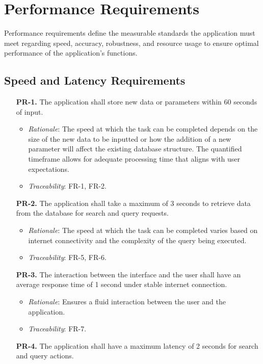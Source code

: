 \documentclass[12pt]{article}
\begin{document}
\section{Performance Requirements}
Performance requirements define the measurable standards the application must meet regarding speed, accuracy, robustness, and resource usage to ensure optimal performance of the application's functions.
\subsection{Speed and Latency Requirements}
\begin{enumerate}
\item[\textbf{PR-1.}] The application shall store new data or parameters within 60 seconds of input.
  \begin{itemize}
    \item \textit{Rationale}: The speed at which the task can be completed depends on the size of the new data to be inputted or how the addition of a new parameter will affect the existing database structure. The quantified timeframe allows for adequate processing time that aligns with user expectations.
    \item \textit{Traceability}: FR-1, FR-2.
  \end{itemize}
\item[\textbf{PR-2.}] The application shall take a maximum of 3 seconds to retrieve data from the database for search and query requests.
  \begin{itemize}
    \item \textit{Rationale}: The speed at which the task can be completed varies based on internet connectivity and the complexity of the query being executed.
    \item \textit{Traceability}: FR-5, FR-6.
  \end{itemize}
\item[\textbf{PR-3.}] The interaction between the interface and the user shall have an average response time of 1 second under stable internet connection.
  \begin{itemize}
    \item \textit{Rationale}: Ensures a fluid interaction between the user and the application.
    \item \textit{Traceability}: FR-7.
  \end{itemize}
\item[\textbf{PR-4.}] The application shall have a maximum latency of 2 seconds for search and query actions.
  \begin{itemize}

\end{itemize}
\end{enumerate}
\end{document}
